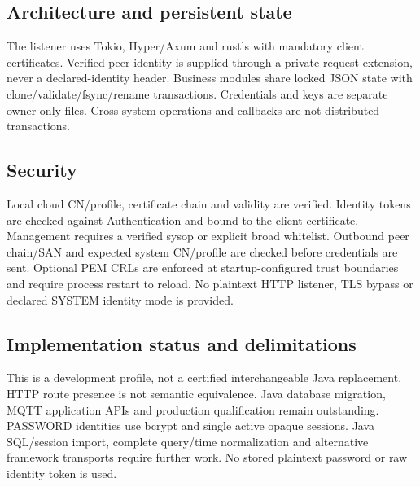 \documentclass[a4paper]{arrowhead}
\begin{document}
\subsection{Architecture and persistent state}
The listener uses Tokio, Hyper/Axum and rustls with mandatory client certificates. Verified peer identity is supplied through a private request extension, never a declared-identity header. Business modules share locked JSON state with clone/validate/fsync/rename transactions. Credentials and keys are separate owner-only files. Cross-system operations and callbacks are not distributed transactions.
\subsection{Security}
Local cloud CN/profile, certificate chain and validity are verified. Identity tokens are checked against Authentication and bound to the client certificate. Management requires a verified sysop or explicit broad whitelist. Outbound peer chain/SAN and expected system CN/profile are checked before credentials are sent. Optional PEM CRLs are enforced at startup-configured trust boundaries and require process restart to reload. No plaintext HTTP listener, TLS bypass or declared SYSTEM identity mode is provided.
\subsection{Implementation status and delimitations}
This is a development profile, not a certified interchangeable Java replacement. HTTP route presence is not semantic equivalence. Java database migration, MQTT application APIs and production qualification remain outstanding.
PASSWORD identities use bcrypt and single active opaque sessions. Java SQL/session import, complete query/time normalization and alternative framework transports require further work. No stored plaintext password or raw identity token is used.
\clearpage
\end{document}
